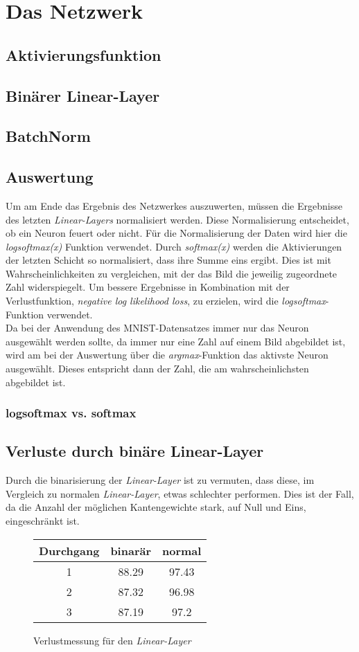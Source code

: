 \chapter{Das Netzwerk}
\section{Aktivierungsfunktion}
\section{Binärer Linear-Layer}
\section{BatchNorm}

\section{Auswertung}
Um am Ende das Ergebnis des Netzwerkes auszuwerten, müssen die Ergebnisse des letzten \textit{Linear-Layers} normalisiert werden. Diese Normalisierung entscheidet, ob ein Neuron feuert oder nicht. Für die Normalisierung der Daten wird hier die \textit{logsoftmax(x)} Funktion verwendet. Durch \textit{softmax(x)} werden die Aktivierungen der letzten Schicht so normalisiert, dass ihre Summe eins ergibt. Dies ist mit Wahrscheinlichkeiten zu vergleichen, mit der das Bild die jeweilig zugeordnete Zahl widerspiegelt. Um bessere Ergebnisse in Kombination mit der Verlustfunktion, \textit{negative log likelihood loss}, zu erzielen, wird die \textit{logsoftmax}-Funktion verwendet.\\
Da bei der Anwendung des MNIST-Datensatzes immer nur das Neuron ausgewählt werden sollte, da immer nur eine Zahl auf einem Bild abgebildet ist, wird am bei der Auswertung über die \textit{argmax}-Funktion das aktivste Neuron ausgewählt. Dieses entspricht dann der Zahl, die am wahrscheinlichsten abgebildet ist.

\subsection{logsoftmax vs. softmax}
\section{Verluste durch binäre Linear-Layer}
Durch die binarisierung der \textit{Linear-Layer} ist zu vermuten, dass diese, im Vergleich zu normalen \textit{Linear-Layer}, etwas schlechter performen. Dies ist der Fall, da die Anzahl der möglichen Kantengewichte stark, auf Null und Eins, eingeschränkt ist. 
\begin{figure}[h]
	\centering
	\begin{tabular}{|c|c|c|}\hline
		Durchgang&binarär&normal\\\hline
		1&88.29&97.43\\\hline
		2&87.32&96.98\\\hline
		3&87.19&97.2\\\hline
	\end{tabular}
\caption{Verlustmessung für den \textit{Linear-Layer}}
\label{fig:linar-layer-verluste}
\end{figure}


